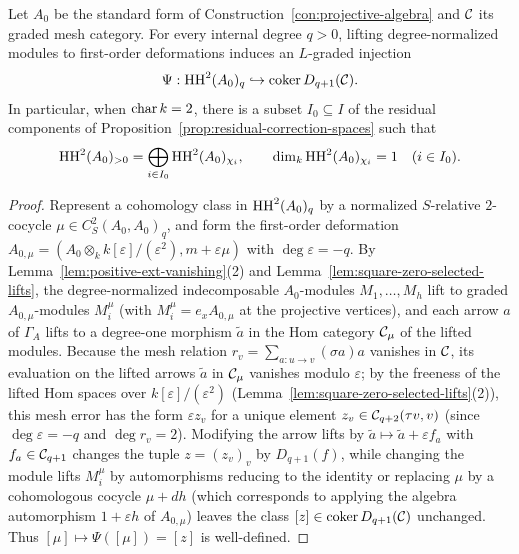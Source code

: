 \begin{proposition}
\label{prop:hochschild-mesh-restriction}
Let $A_0$ be the standard form of Construction~\ref{con:projective-algebra}
and $\mathcal C$ its graded mesh category. For every internal degree $q>0$, lifting
degree-normalized modules to first-order deformations induces an $L$-graded
injection
\[
 \Psi:\operatorname{HH}^2(A_0)_q\hookrightarrow\operatorname{coker}D_{q+1}(\mathcal C).
\]
In particular, when $\operatorname{char} k=2$, there is a subset $I_0\subseteq I$ of the
residual components of Proposition~\ref{prop:residual-correction-spaces}
such that
\[
 \operatorname{HH}^2(A_0)_{>0}=\bigoplus_{i\in I_0}\operatorname{HH}^2(A_0)_{\chi_i},
 \qquad \dim_k\operatorname{HH}^2(A_0)_{\chi_i}=1\quad(i\in I_0).
\]
\end{proposition}
\begin{proof}
Represent a cohomology class in $\operatorname{HH}^2(A_0)_q$ by a normalized $S$-relative
$2$-cocycle $\mu\in C^2_S(A_0,A_0)_q$, and form the first-order deformation
$A_{0,\mu}=(A_0\otimes_k k[\varepsilon]/(\varepsilon^2),m+\varepsilon\mu)$
with $\deg\varepsilon=-q$. By Lemma~\ref{lem:positive-ext-vanishing}(2) and
Lemma~\ref{lem:square-zero-selected-lifts}, the degree-normalized
indecomposable $A_0$-modules $M_1,\ldots,M_h$ lift to graded
$A_{0,\mu}$-modules $M_i^\mu$ (with $M_i^\mu=e_x A_{0,\mu}$ at the projective
vertices), and each arrow $a$ of $\Gamma_A$ lifts to a degree-one morphism
$\tilde a$ in the Hom category $\mathcal C_\mu$ of the lifted modules. Because the
mesh relation $r_v=\sum_{a:u\to v}(\sigma a)a$ vanishes in $\mathcal C$, its evaluation
on the lifted arrows $\tilde a$ in $\mathcal C_\mu$ vanishes modulo $\varepsilon$; by
the freeness of the lifted Hom spaces over $k[\varepsilon]/(\varepsilon^2)$
(Lemma~\ref{lem:square-zero-selected-lifts}(2)), this mesh error has the form
$\varepsilon z_v$ for a unique element $z_v\in\mathcal C_{q+2}(\tau v,v)$ (since
$\deg\varepsilon=-q$ and $\deg r_v=2$). Modifying the arrow lifts by
$\tilde a\mapsto\tilde a+\varepsilon f_a$ with $f_a\in\mathcal C_{q+1}$ changes the
tuple $z=(z_v)_v$ by $D_{q+1}(f)$, while changing the module lifts $M_i^\mu$
by automorphisms reducing to the identity or replacing $\mu$ by a cohomologous
cocycle $\mu+dh$ (which corresponds to applying the algebra automorphism
$1+\varepsilon h$ of $A_{0,\mu}$) leaves the class $[z]\in\operatorname{coker}D_{q+1}(\mathcal C)$
unchanged. Thus $[\mu]\mapsto\Psi([\mu])=[z]$ is well-defined.


\end{proof}
